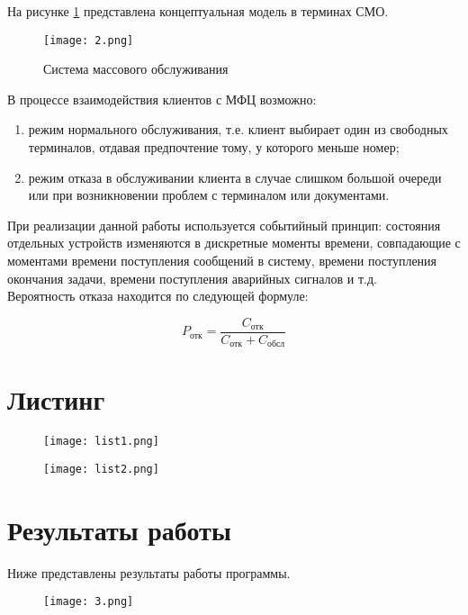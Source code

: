 \documentclass[a4paper,fontsize=12bp]{extreport}
\begin{document}
\newpage
На рисунке \ref{fig:2} представлена концептуальная модель в терминах СМО.
\begin{figure}[H]
    \texttt{[image: 2.png]}
    \caption{Система массового обслуживания}
    \label{fig:2}
\end{figure}

В процессе взаимодействия клиентов с МФЦ возможно: 
\begin{enumerate}
\item режим нормального обслуживания, т.е. клиент выбирает один из свободных терминалов, отдавая предпочтение тому, у которого меньше номер;
\item режим отказа в обслуживании клиента в случае слишком большой очереди или при возникновении проблем с терминалом или документами.\\
\end{enumerate}
 
При реализации данной работы используется событийный принцип: состояния отдельных устройств изменяются в дискретные моменты времени, совпадающие с моментами времени поступления сообщений в систему, времени поступления окончания задачи, времени поступления аварийных сигналов и т.д.\\
 
Вероятность отказа находится по следующей формуле:

$$P_\text{отк} = \frac{C_\text{отк}}{C_\text{отк}+C_\text{обсл}}$$

\section*{Листинг}

\begin{figure}[H]
    \texttt{[image: list1.png]}
    \label{fig:l1}
\end{figure}

\begin{figure}[H]
    \texttt{[image: list2.png]}
    \label{fig:l2}
\end{figure}

\newpage
\section*{Результаты работы}

Ниже представлены результаты работы программы.

\begin{figure}[H]
    \texttt{[image: 3.png]}
    \label{fig:3}
\end{figure}
\end{document}
